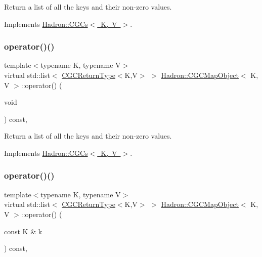 Return a list of all the keys and their non-\/zero values. 



Implements \mbox{\hyperlink{classHadron_1_1CGCs_ac709374b31c0319e82028b9d7c23e993}{Hadron\+::\+C\+G\+Cs$<$ K, V $>$}}.

\mbox{\label{classHadron_1_1CGCMapObject_aaa4b18e1a2845e16154cd434462c0779}} 
\subsubsection{\texorpdfstring{operator()()}{operator()()}\hspace{0.1cm}{\footnotesize\ttfamily [2/4]}}
{\footnotesize\ttfamily template$<$typename K, typename V$>$ \\
virtual std\+::list$<$ \mbox{\hyperlink{structHadron_1_1CGCReturnType}{C\+G\+C\+Return\+Type}}$<$K,V$>$ $>$ \mbox{\hyperlink{classHadron_1_1CGCMapObject}{Hadron\+::\+C\+G\+C\+Map\+Object}}$<$ K, V $>$\+::operator() (\begin{DoxyParamCaption}\item[{void}]{ }\end{DoxyParamCaption}) const\hspace{0.3cm}{\ttfamily [inline]}, {\ttfamily [virtual]}}



Return a list of all the keys and their non-\/zero values. 



Implements \mbox{\hyperlink{classHadron_1_1CGCs_ac709374b31c0319e82028b9d7c23e993}{Hadron\+::\+C\+G\+Cs$<$ K, V $>$}}.

\mbox{\label{classHadron_1_1CGCMapObject_aeb342dc81f17743a25b969f540db4edf}} 
\subsubsection{\texorpdfstring{operator()()}{operator()()}\hspace{0.1cm}{\footnotesize\ttfamily [3/4]}}
{\footnotesize\ttfamily template$<$typename K, typename V$>$ \\
virtual std\+::list$<$ \mbox{\hyperlink{structHadron_1_1CGCReturnType}{C\+G\+C\+Return\+Type}}$<$K,V$>$ $>$ \mbox{\hyperlink{classHadron_1_1CGCMapObject}{Hadron\+::\+C\+G\+C\+Map\+Object}}$<$ K, V $>$\+::operator() (\begin{DoxyParamCaption}\item[{const K \&}]{k }\end{DoxyParamCaption}) const\hspace{0.3cm}{\ttfamily [inline]}, {\ttfamily [virtual]}}



